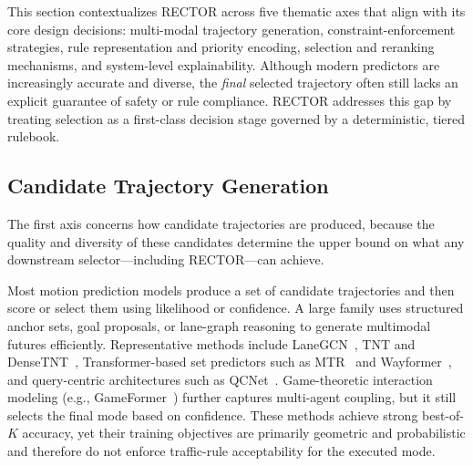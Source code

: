 This section contextualizes RECTOR across five thematic axes that align with its core design decisions: multi-modal trajectory generation, constraint-enforcement strategies, rule representation and priority encoding, selection and reranking mechanisms, and system-level explainability.  Although modern predictors are increasingly accurate and diverse, the \emph{final} selected trajectory often still lacks an explicit guarantee of safety or rule compliance.  RECTOR addresses this gap by treating selection as a first-class decision stage governed by a deterministic, tiered rulebook.

\subsection{Candidate Trajectory Generation}
\label{subsec:candidate_generation}

The first axis concerns how candidate trajectories are produced, because the quality and diversity of these candidates determine the upper bound on what any downstream selector---including RECTOR---can achieve.

Most motion prediction models produce a set of candidate trajectories and then score or select them using likelihood or confidence.  A large family uses structured anchor sets, goal proposals, or lane-graph reasoning to generate multimodal futures efficiently.  Representative methods include LaneGCN~\cite{liang2020lanegcn}, TNT and DenseTNT~\cite{zhao2021tnt,gu2021densetnt}, Transformer-based set predictors such as MTR~\cite{shi2022motion} and Wayformer~\cite{nayakanti2023wayformer}, and query-centric architectures such as QCNet~\cite{zhou2023qcnet}.  Game-theoretic interaction modeling (e.g., GameFormer~\cite{huang2023gameformer}) further captures multi-agent coupling, but it still selects the final mode based on confidence.  These methods achieve strong best-of-$K$ accuracy, yet their training objectives are primarily geometric and probabilistic and therefore do not enforce traffic-rule acceptability for the executed mode.

